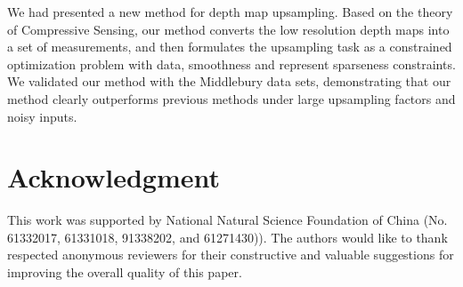 \documentclass[preprint,10pt,5p,times,twocolumn]{elsarticle}
\begin{document}
We had presented a new method for depth map upsampling. Based on the theory of Compressive Sensing, our method converts the low resolution depth maps into a set of measurements, and then formulates the upsampling task as a constrained optimization problem with data, smoothness and represent sparseness constraints. We validated our method with the Middlebury data sets, demonstrating that our method clearly outperforms previous methods under large upsampling factors and noisy inputs.


\section{Acknowledgment}

This work was supported by National Natural Science Foundation of China (No. 61332017, 61331018, 91338202, and 61271430)). The authors would like to thank respected anonymous reviewers for their constructive and valuable suggestions for improving the overall quality of this paper.
\end{document}
